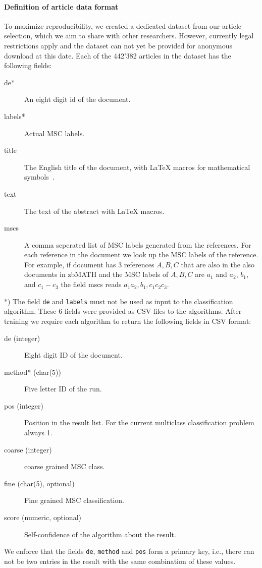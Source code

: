 \paragraph{Definition of article data format}
To maximize reproducibility, we created a dedicated dataset from our article selection, which we aim to share with other researchers.
However, currently legal restrictions apply and the dataset can not yet be provided for anonymous download at this date.
Each of the 442'382 articles in the dataset has the following fields:
\begin{description}
  \item[de*] An eight digit id of the document.
  \item[labels*] Actual MSC labels.
  \item[title] The English title of the document, with LaTeX macros for mathematical symbols~\cite{Schubotz2019b}.
  \item[text] The text of the abstract with LaTeX macros.
  \item[mscs] A comma seperated list of MSC labels generated from the references. For each reference in the document we look up the MSC labels of the reference. For example, if document has 3 references $A,B,C$ that are also in the also documents in zbMATH and the MSC labels of $A,B,C$ are $a_1$ and $a_2$, $b_1$, and $c_1-c_3$ the field mscs reads $a_1  a_2, b_1, c_1 c_2 c_3.$
\end{description}
*) The field \texttt{de} and \texttt{labels} must not be used as input to the classification algorithm.
These 6 fields were provided as CSV files to the algorithms.
After training we require each algorithm to return the following fields in CSV format:
\begin{description}
  \item[de (integer)] Eight digit ID of the document.
  \item[method* (char(5))] Five letter ID of the run.
  \item[pos (integer)] Position in the result list. For the current multiclass classification problem always 1.
  \item[coarse (integer)] coarse grained MSC class.
  \item[fine (char(5), optional)] Fine grained MSC classification.
  \item[score (numeric, optional)] Self-confidence of the algorithm about the result. 
\end{description}
We enforce that the fields \texttt{de}, \texttt{method} and \texttt{pos} form a primary key, i.e., there can not be two entries in the result with the same combination of these values.
